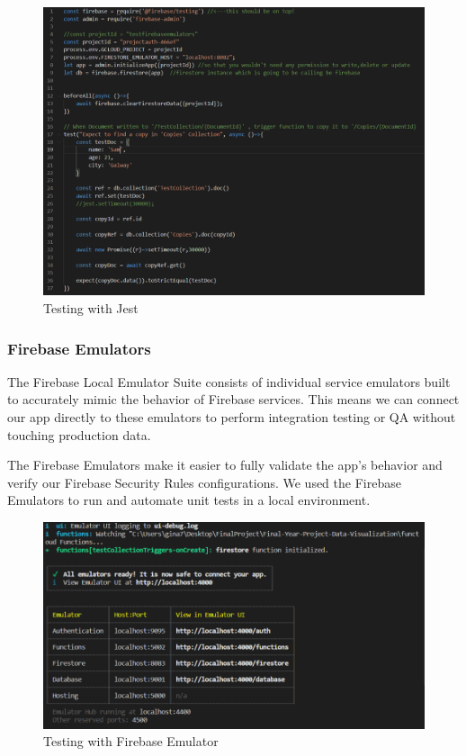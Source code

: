 \begin{figure}[H]
    \centering
    \includegraphics[scale=0.5]{img/jest.PNG}
    \caption{Testing with Jest}
    \label{fig:my_label4}
\end{figure}

\subsubsection{Firebase Emulators}
The Firebase Local Emulator Suite consists of individual service emulators built to accurately mimic the behavior of Firebase services. This means we can connect our app directly to these emulators to perform integration testing or QA without touching production data.\cite{fbemulator}

The Firebase Emulators make it easier to fully validate the app's behavior and verify our Firebase Security Rules configurations.
We used the Firebase Emulators to run and automate unit tests in a local environment. 

\begin{figure}[ht]
    \centering
    \includegraphics[scale=0.7]{img/FirebaseEmulator.PNG}
    \caption{Testing with Firebase Emulator}
    \label{fig:my_label4}
\end{figure}

